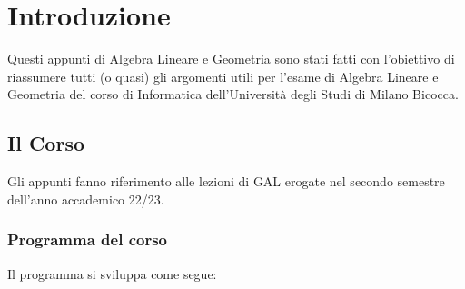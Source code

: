 \chapter*{Introduzione}

Questi appunti di Algebra Lineare e Geometria sono stati fatti con l'obiettivo di riassumere tutti (o quasi) gli argomenti utili per 
l'esame di  Algebra Lineare e Geometria del corso di Informatica dell'Università degli Studi di Milano Bicocca.


\section*{Il Corso}
Gli appunti fanno riferimento alle lezioni di GAL erogate nel secondo semestre dell'anno accademico 22/23.

\subsection*{Programma del corso}
Il programma si sviluppa come segue:
